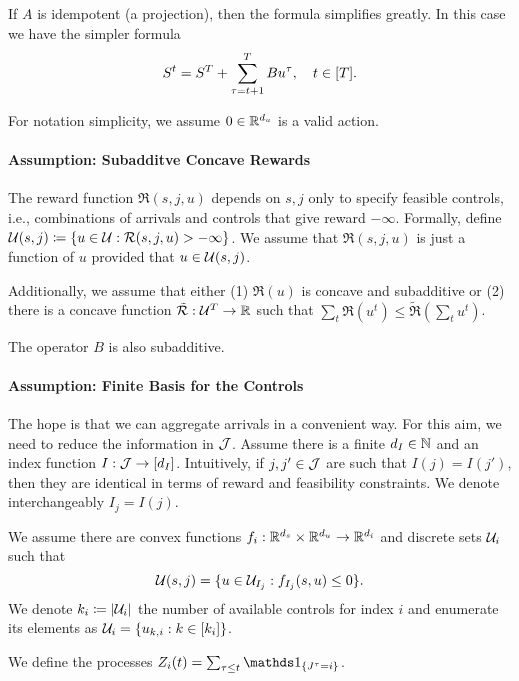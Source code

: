 \documentclass[letterpaper,11pt]{article}
\begin{document}
If $A$ is idempotent (a projection), then the formula simplifies greatly.
In this case we have the simpler formula
\begin{equation}\label{eq:linear_state}
S^t = S^T + \sum_{\tau=t+1}^T Bu^\tau, \quad t\in[T].
\end{equation}

For notation simplicity, we assume $0\in \mathbb{R}^{d_u}$ is a valid action.


\paragraph{Assumption: Subadditve Concave Rewards}
The reward function $\Re(s,j,u)$ depends on $s,j$ only to specify feasible controls, i.e., combinations of arrivals and controls that give reward $-\infty$.
Formally, define $\mathcal{U}(s,j)\coloneqq \{u\in\mathcal{U}: \mathcal{R}(s,j,u)>-\infty\}$.
We assume that $\Re(s,j,u)$ is just a function of $u$ provided that $u\in\mathcal{U}(s,j)$.

Additionally, we assume that either (1) $\Re(u)$ is concave and subadditive or (2) there is a concave function $\tilde {\mathcal{R}}:\mathcal{U}^T\to\mathbb{R}$ such that $\sum_t\Re(u^t)\leq \tilde \Re(\sum_t u^t)$.

The operator $B$ is also subadditive.

\paragraph{Assumption: Finite Basis for the Controls}
The hope is that we can aggregate arrivals in a convenient way.
For this aim, we need to reduce the information in $\mathcal{J}$.
Assume there is a finite ${d_I}\in\mathbb{N}$ and an index function $I:\mathcal{J}\to[{d_I}]$.
Intuitively, if $j,j'\in\mathcal{J}$ are such that $I(j)=I(j')$, then they are identical in terms of reward and feasibility constraints.
We denote interchangeably $I_j=I(j)$.

We assume there are convex functions $f_i:\mathbb{R}^{d_s}\times\mathbb{R}^{d_u}\to\mathbb{R}^{d_i}$ and discrete sets $\mathcal{U}_i$ such that
\[
\mathcal{U}(s,j) = \{u\in \mathcal{U}_{I_j}: f_{I_j}(s,u)\leq 0\}.
\]
We denote $k_i\coloneqq \lvert\mathcal{U}_i\rvert$ the number of available controls for index $i$ and enumerate its elements as $\mathcal{U}_i = \{u_{k,i}: k\in [k_i]\}$. 

We define the processes $Z_i(t)=\sum_{\tau\leq t}\In{J^\tau=i}$.

\end{document}
